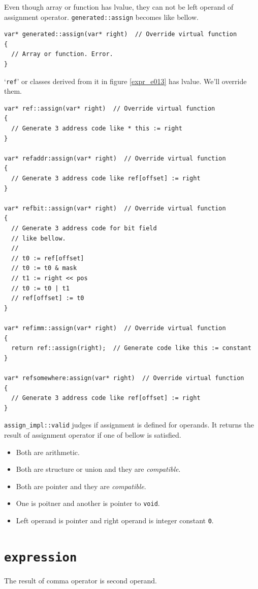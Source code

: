 Even though array or function has lvalue, they can not be left operand
of assignment operator.
{\tt{generated::assign}} becomes like bellow.
\begin{verbatim}
var* generated::assign(var* right)  // Override virtual function
{
  // Array or function. Error.
}
\end{verbatim}
`{\tt{ref}}' or classes derived from it in figure \ref{expr_e013}
has lvalue. We'll override them.
\begin{verbatim}
var* ref::assign(var* right)  // Override virtual function
{
  // Generate 3 address code like * this := right
}

var* refaddr:assign(var* right)  // Override virtual function
{
  // Generate 3 address code like ref[offset] := right
}

var* refbit::assign(var* right)  // Override virtual function
{
  // Generate 3 address code for bit field
  // like bellow.
  //
  // t0 := ref[offset]
  // t0 := t0 & mask
  // t1 := right << pos
  // t0 := t0 | t1
  // ref[offset] := t0
}

var* refimm::assign(var* right)  // Override virtual function
{
  return ref::assign(right);  // Generate code like this := constant 
}

var* refsomewhere:assign(var* right)  // Override virtual function
{
  // Generate 3 address code like ref[offset] := right
}
\end{verbatim}

{\tt{assign\_impl::valid}} judges if assignment is defined for operands.
It returns the result of assignment operator if one of bellow is satisfied.
\begin{itemize}
\item Both are arithmetic.
\item Both are structure or union and they are {\em compatible}.
\item Both are pointer and they are {\em compatible}.
\item One is poitner and another is pointer to {\tt{void}}.
\item Left operand is pointer and right operand is integer constant {\tt{0}}.
\end{itemize}

\section{\tt{expression}}

The result of comma operator is second operand.

